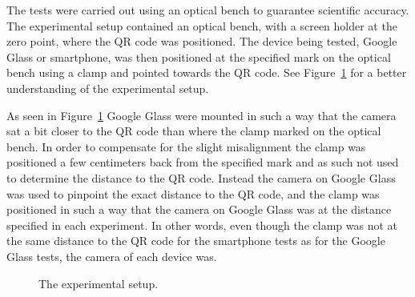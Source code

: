%
The tests were carried out using an optical bench to guarantee scientific accuracy. The experimental setup contained an optical bench, with a screen holder at the zero point, where the QR code was positioned. The device being tested, Google Glass or smartphone, was then positioned at the specified mark on the optical bench using a clamp and pointed towards the QR code. See Figure~\ref{experimentalSetup} for a better understanding of the experimental setup. 

As seen in Figure~\ref{experimentalSetup} Google Glass were mounted in such a way that the camera sat a bit closer to the QR code than where the clamp marked on the optical bench. In order to compensate for the slight misalignment the clamp was positioned a few centimeters back from the specified mark and as such not used to determine the distance to the QR code. Instead the camera on Google Glass was used to pinpoint the exact distance to the QR code, and the clamp was positioned in such a way that the camera on Google Glass was at the distance specified in each experiment. In other words, even though the clamp was not at the same distance to the QR code for the smartphone tests as for the Google Glass tests, the camera of each device was.

	\begin{figure}[H]%
		\centering
   		 \qquad
   		 \qquad
		\caption{The experimental setup.}
		\label{experimentalSetup}
	\end{figure}

